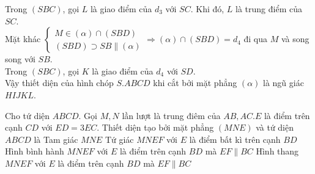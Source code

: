 \begin{ex}
{		Trong $(S B C)$, gọi $L$ là giao điểm của $d_3$ với $S C$. Khi đó, $L$ là trung điểm của $S C$.\\
		Mặt khác
		$\left\{\begin{array}{l}M \in(\alpha) \cap(S B D) \\ (S B D) \supset S B \parallel(\alpha)\end{array} \Rightarrow(\alpha) \cap(S B D)=d_4\right.$ đi qua $M$ và song song với $S B$.\\
		Trong $(S B C)$, gọi $K$ là giao điểm của $d_4$ với $S D$.\\
		Vậy thiết diện của hình chóp $S . A B C D$ khi cắt bởi mặt phẳng $(\alpha)$ là ngũ giác $H I J K L$.			
	}
\end{ex}

\begin{ex}%
	Cho tứ diện $A B C D$. Gọi $M, N$ lần lượt là trung điêm của $A B, A C . E$ là điểm trên cạnh $C D$ với $E D=3 E C$. Thiết diện tạo bởi mặt phẳng $(M N E)$ và tứ diện $A B C D$ là
	\choice
	{Tam giác $M N E$}
	{Tứ giác $M N E F$ với $E$ là điểm bất kì trên cạnh $B D$}
	{Hình bình hành $M N E F$ với $E$ là điểm trên cạnh $B D$ mà $E F \parallel B C$}
	{\True Hình thang $M N E F$ với $E$ là điểm trên cạnh $B D$ mà $E F \parallel B C$}
\end{ex}
